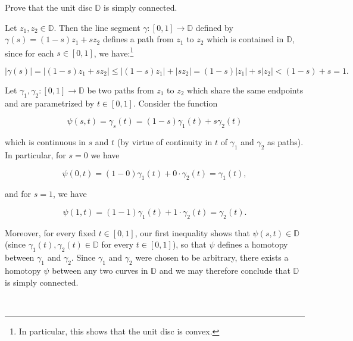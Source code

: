 Prove that the unit disc $\mathbb{D}$ is simply connected.

\begin{solution}
  Let $z_1, z_2 \in \mathbb{D}$. Then the line segment $\gamma: [0, 1] \to \mathbb{D}$ defined by
  $\gamma(s) = (1 - s) z_1 + s z_2$ defines a path from $z_1$ to $z_2$ which is contained in $\mathbb{D}$, since
  for each $s \in [0, 1]$, we have:\footnote{
    In particular, this shows that the unit disc is convex.
  }

  $$
  |\gamma(s)| = |(1 - s) z_1 + s z_2| \leq |(1 - s) z_1| + |s z_2| = (1 - s)|z_1| + s |z_2| < (1 - s) + s = 1.
  $$
 
  Let $\gamma_1, \gamma_2: [0, 1] \to \mathbb{D}$ be two paths from $z_1$ to $z_2$ which share the same endpoints and
  are parametrized by $t \in [0, 1]$. Consider the function

  $$
  \psi(s, t) = \gamma_s(t) = (1 - s)\gamma_1(t) + s \gamma_2(t)
  $$

  which is continuous in $s$ and $t$ (by virtue of continuity in $t$ of $\gamma_1$ and $\gamma_2$ as paths). In 
  particular, for $s = 0$ we have

  $$
  \psi(0, t) = (1 - 0) \gamma_1(t) + 0 \cdot \gamma_2(t) = \gamma_1(t),
  $$

  and for $s = 1$, we have
 
  $$
  \psi(1, t) = (1 - 1)\gamma_1(t) + 1 \cdot \gamma_2(t) = \gamma_2(t).
  $$

  Moreover, for every fixed $t \in [0, 1]$, our first inequality shows that $\psi(s, t) \in \mathbb{D}$ (since 
  $\gamma_1(t), \gamma_2(t) \in \mathbb{D}$ for every $t \in [0, 1]$), so that $\psi$ defines a homotopy between 
  $\gamma_1$ and $\gamma_2$. Since $\gamma_1$ and $\gamma_2$ were chosen to be arbitrary, there exists a homotopy
  $\psi$ between any two curves in $\mathbb{D}$ and we may therefore conclude that $\mathbb{D}$ is simply connected.
  
  \ \\
\end{solution}

